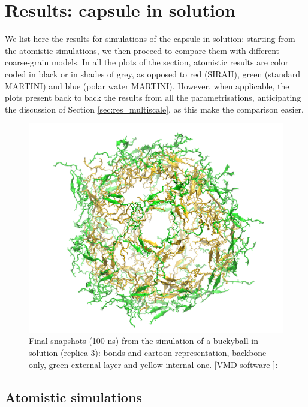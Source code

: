 \section{Results: capsule in solution} \label{sec:results_cap}
We list here the results for simulations of the capsule in solution: starting from the atomistic simulations, we then proceed to compare them with different coarse-grain models. In all the plots of the section, atomistic results are color coded in black or in shades of grey, as opposed to red (SIRAH), green (standard MARTINI) and blue (polar water MARTINI). However, when applicable, the plots present back to back the results from all the parametrisations, anticipating the discussion of Section \ref{sec:res_multiscale}, as this make the comparison easier.

\begin{figure}[t]
\centering
\includegraphics[width=0.5\linewidth]{3results_capsule/pics/staR3_render}
\caption[Atomistic run of buckyball in solution: final configuration]{Final snapshots (100 ns) from the simulation of a buckyball in solution (replica 3): bonds and cartoon representation, backbone only, green external layer and yellow internal one. [VMD software \citet{HUMP96}]: }
\label{fig:BTI_snap}
\end{figure}

\subsection{Atomistic simulations}

